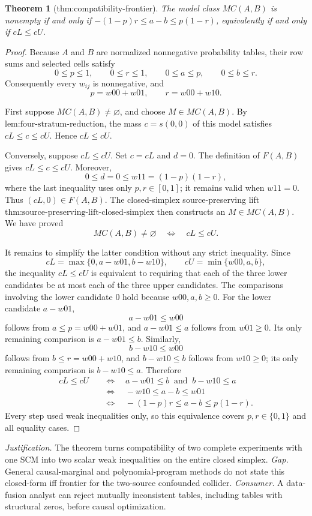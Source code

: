\documentclass{article}
\newtheorem{theorem}{Theorem}
\begin{document}
\begin{theorem}[thm:compatibility-frontier]\label{thm:compatibility-frontier}
The model class \(MC(A,B)\) is nonempty if and only if \(-(1-p)r\le a-b\le p(1-r)\), equivalently if and only if \(cL\le cU\).
\end{theorem}
\begin{proof}
Because \(A\) and \(B\) are normalized nonnegative probability tables, their row sums and selected cells satisfy
\[
0\le p\le1,\qquad 0\le r\le1,\qquad 0\le a\le p,\qquad 0\le b\le r.
\]
Consequently every \(w_{ij}\) is nonnegative, and
\[
p=w00+w01,\qquad r=w00+w10.
\]

First suppose \(MC(A,B)\ne\varnothing\), and choose \(M\in MC(A,B)\).  By \(\text{lem:four-stratum-reduction}\), the mass \(c=s(0,0)\) of this model satisfies \(cL\le c\le cU\).  Hence \(cL\le cU\).

Conversely, suppose \(cL\le cU\).  Set \(c=cL\) and \(d=0\).  The definition of \(F(A,B)\) gives \(cL\le c\le cU\).  Moreover,
\[
0\le d=0\le w11=(1-p)(1-r),
\]
where the last inequality uses only \(p,r\in[0,1]\); it remains valid when \(w11=0\).  Thus \((cL,0)\in F(A,B)\).  The closed-simplex source-preserving lift \(\text{thm:source-preserving-lift-closed-simplex}\) then constructs an \(M\in MC(A,B)\).  We have proved
\[
MC(A,B)\ne\varnothing\quad\Longleftrightarrow\quad cL\le cU.
\]

It remains to simplify the latter condition without any strict inequality.  Since
\[
cL=\max\{0,a-w01,b-w10\},\qquad cU=\min\{w00,a,b\},
\]
the inequality \(cL\le cU\) is equivalent to requiring that each of the three lower candidates be at most each of the three upper candidates.  The comparisons involving the lower candidate \(0\) hold because \(w00,a,b\ge0\).  For the lower candidate \(a-w01\),
\[
a-w01\le w00
\]
follows from \(a\le p=w00+w01\), and \(a-w01\le a\) follows from \(w01\ge0\).  Its only remaining comparison is \(a-w01\le b\).  Similarly,
\[
b-w10\le w00
\]
follows from \(b\le r=w00+w10\), and \(b-w10\le b\) follows from \(w10\ge0\); its only remaining comparison is \(b-w10\le a\).  Therefore
\[
\begin{aligned}
cL\le cU
&\quad\Longleftrightarrow\quad a-w01\le b\ \text{ and }\ b-w10\le a\\
&\quad\Longleftrightarrow\quad -w10\le a-b\le w01\\
&\quad\Longleftrightarrow\quad -(1-p)r\le a-b\le p(1-r).
\end{aligned}
\]
Every step used weak inequalities only, so this equivalence covers \(p,r\in\{0,1\}\) and all equality cases.
\end{proof}
\par\smallskip\noindent \textit{Justification.} The theorem turns compatibility of two complete experiments with one SCM into two scalar weak inequalities on the entire closed simplex. \textit{Gap.} General causal-marginal and polynomial-program methods do not state this closed-form iff frontier for the two-source confounded collider. \textit{Consumer.} A data-fusion analyst can reject mutually inconsistent tables, including tables with structural zeros, before causal optimization.
\end{document}
